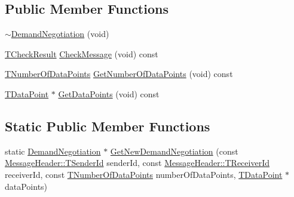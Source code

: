 \subsection*{Public Member Functions}
\begin{DoxyCompactItemize}
\item 
\hyperlink{class_terra_swarm_1_1_synchronous_1_1_demand_negotiation_a305449b096b0a75cc403222653b241a4}{$\sim$\-Demand\-Negotiation} (void)
\item 
\hyperlink{class_terra_swarm_1_1_synchronous_1_1_demand_negotiation_abf70719cd7b70d3eeecb1949bc2157a3}{T\-Check\-Result} \hyperlink{class_terra_swarm_1_1_synchronous_1_1_demand_negotiation_a1ebc766e094f58150ff5d1fa78031294}{Check\-Message} (void) const 
\item 
\hyperlink{class_terra_swarm_1_1_synchronous_1_1_demand_negotiation_aeaaae7fc1861d9af2bff4c9dcb4d89ac}{T\-Number\-Of\-Data\-Points} \hyperlink{class_terra_swarm_1_1_synchronous_1_1_demand_negotiation_af0694c36ab00a1dadf8bb8f1b3c7c159}{Get\-Number\-Of\-Data\-Points} (void) const 
\item 
\hyperlink{class_terra_swarm_1_1_synchronous_1_1_demand_negotiation_a6660353fa0a65775070bba8571a76e3d}{T\-Data\-Point} $\ast$ \hyperlink{class_terra_swarm_1_1_synchronous_1_1_demand_negotiation_ab99ce665f0822299184ff34cf5e674d2}{Get\-Data\-Points} (void) const 
\end{DoxyCompactItemize}
\subsection*{Static Public Member Functions}
\begin{DoxyCompactItemize}
\item 
static \hyperlink{class_terra_swarm_1_1_synchronous_1_1_demand_negotiation}{Demand\-Negotiation} $\ast$ \hyperlink{class_terra_swarm_1_1_synchronous_1_1_demand_negotiation_a99ffac24b0af7f388d29eb47d3c19f33}{Get\-New\-Demand\-Negotiation} (const \hyperlink{class_terra_swarm_1_1_message_header_a516b36855e2aad7cfbf8770f1b42784f}{Message\-Header\-::\-T\-Sender\-Id} sender\-Id, const \hyperlink{class_terra_swarm_1_1_message_header_aa3260702b182b6f88ddbdd3416e98df0}{Message\-Header\-::\-T\-Receiver\-Id} receiver\-Id, const \hyperlink{class_terra_swarm_1_1_synchronous_1_1_demand_negotiation_aeaaae7fc1861d9af2bff4c9dcb4d89ac}{T\-Number\-Of\-Data\-Points} number\-Of\-Data\-Points, \hyperlink{class_terra_swarm_1_1_synchronous_1_1_demand_negotiation_a6660353fa0a65775070bba8571a76e3d}{T\-Data\-Point} $\ast$data\-Points)
\end{DoxyCompactItemize}

